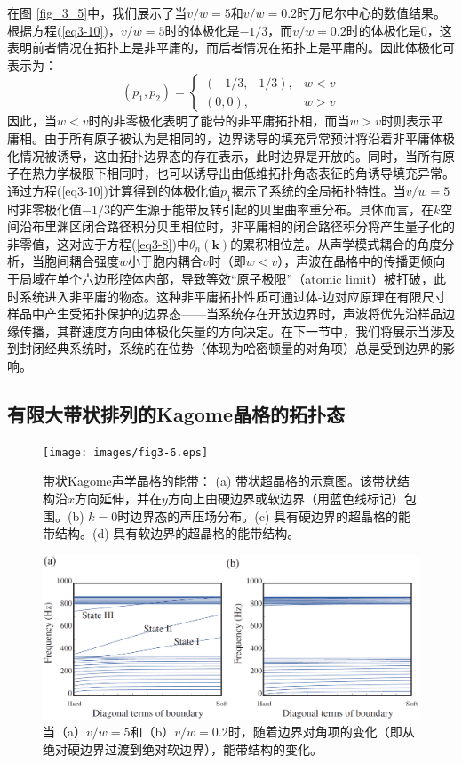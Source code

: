 在图 \ref{fig_3_5}中，我们展示了当\(v/w = 5\)和\(v/w = 0.2\)时万尼尔中心的数值结果。根据方程(\ref{eq3-10})，\(v/w = 5\)时的体极化是\(-1/3\)，而\(v/w = 0.2\)时的体极化是\(0\)，这表明前者情况在拓扑上是非平庸的，而后者情况在拓扑上是平庸的。因此体极化可表示为：
\begin{equation} \label{eq3-11}
  (p_1,p_2) = 
  \begin{cases}
  (-1/3,-1/3), & w < v \\
  (0,0), & w > v
  \end{cases}
\end{equation}
因此，当$w < v$时的非零极化表明了能带的非平庸拓扑相，而当$w > v$时则表示平庸相。由于所有原子被认为是相同的，边界诱导的填充异常预计将沿着非平庸体极化情况被诱导，这由拓扑边界态的存在表示，此时边界是开放的。同时，当所有原子在热力学极限下相同时，也可以诱导出由低维拓扑角态表征的角诱导填充异常\cite{C3-3}。通过方程(\ref{eq3-10})计算得到的体极化值$p_1$揭示了系统的全局拓扑特性。当$v/w=5$时非零极化值$-1/3$的产生源于能带反转引起的贝里曲率重分布。具体而言，在$k$空间沿布里渊区闭合路径积分贝里相位时，非平庸相的闭合路径积分将产生量子化的非零值，这对应于方程(\ref{eq3-8})中$\theta_n(\mathbf{k})$的累积相位差。从声学模式耦合的角度分析，当胞间耦合强度$w$小于胞内耦合$v$时（即$w<v$），声波在晶格中的传播更倾向于局域在单个六边形腔体内部，导致等效“原子极限”（atomic limit）被打破，此时系统进入非平庸的物态。这种非平庸拓扑性质可通过体-边对应原理在有限尺寸样品中产生受拓扑保护的边界态——当系统存在开放边界时，声波将优先沿样品边缘传播，其群速度方向由体极化矢量的方向决定。在下一节中，我们将展示当涉及到封闭经典系统时，系统的在位势（体现为哈密顿量的对角项）总是受到边界的影响。

\subsection{有限大带状排列的Kagome晶格的拓扑态}

\begin{figure}[h!]
  \centering
  \texttt{[image: images/fig3-6.eps]} 
  \caption{带状Kagome声学晶格的能带：
  (a) 带状超晶格的示意图。该带状结构沿$x$方向延伸，并在$y$方向上由硬边界或软边界（用蓝色线标记）包围。(b) $k = 0$时边界态的声压场分布。(c) 具有硬边界的超晶格的能带结构。(d) 具有软边界的超晶格的能带结构。
  }
  \label{fig_3_6}
\end{figure}

\begin{figure}[h!]
  \centering
  \includegraphics[width=1\textwidth]{images/fig3-7.eps} 
  \caption{当（a）\(v/w = 5\)和（b）\(v/w = 0.2\)时，随着边界对角项的变化（即从绝对硬边界过渡到绝对软边界），能带结构的变化。}
  \label{fig_3_7}
\end{figure}

